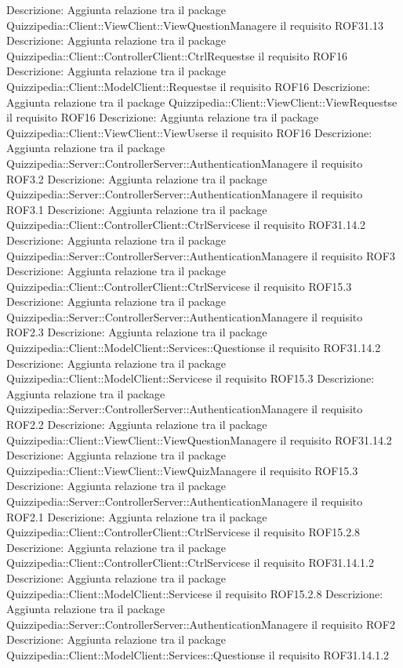 Descrizione: Aggiunta relazione tra il package Quizzipedia::Client::ViewClient::ViewQuestionManagere il requisito ROF31.13 
Descrizione: Aggiunta relazione tra il package Quizzipedia::Client::ControllerClient::CtrlRequestse il requisito ROF16 
Descrizione: Aggiunta relazione tra il package Quizzipedia::Client::ModelClient::Requestse il requisito ROF16 
Descrizione: Aggiunta relazione tra il package Quizzipedia::Client::ViewClient::ViewRequestse il requisito ROF16 
Descrizione: Aggiunta relazione tra il package Quizzipedia::Client::ViewClient::ViewUserse il requisito ROF16 
Descrizione: Aggiunta relazione tra il package Quizzipedia::Server::ControllerServer::AuthenticationManagere il requisito ROF3.2 
Descrizione: Aggiunta relazione tra il package Quizzipedia::Server::ControllerServer::AuthenticationManagere il requisito ROF3.1 
Descrizione: Aggiunta relazione tra il package Quizzipedia::Client::ControllerClient::CtrlServicese il requisito ROF31.14.2 
Descrizione: Aggiunta relazione tra il package Quizzipedia::Server::ControllerServer::AuthenticationManagere il requisito ROF3 
Descrizione: Aggiunta relazione tra il package Quizzipedia::Client::ControllerClient::CtrlServicese il requisito ROF15.3 
Descrizione: Aggiunta relazione tra il package Quizzipedia::Server::ControllerServer::AuthenticationManagere il requisito ROF2.3 
Descrizione: Aggiunta relazione tra il package Quizzipedia::Client::ModelClient::Services::Questionse il requisito ROF31.14.2 
Descrizione: Aggiunta relazione tra il package Quizzipedia::Client::ModelClient::Servicese il requisito ROF15.3 
Descrizione: Aggiunta relazione tra il package Quizzipedia::Server::ControllerServer::AuthenticationManagere il requisito ROF2.2 
Descrizione: Aggiunta relazione tra il package Quizzipedia::Client::ViewClient::ViewQuestionManagere il requisito ROF31.14.2 
Descrizione: Aggiunta relazione tra il package Quizzipedia::Client::ViewClient::ViewQuizManagere il requisito ROF15.3 
Descrizione: Aggiunta relazione tra il package Quizzipedia::Server::ControllerServer::AuthenticationManagere il requisito ROF2.1 
Descrizione: Aggiunta relazione tra il package Quizzipedia::Client::ControllerClient::CtrlServicese il requisito ROF15.2.8 
Descrizione: Aggiunta relazione tra il package Quizzipedia::Client::ControllerClient::CtrlServicese il requisito ROF31.14.1.2 
Descrizione: Aggiunta relazione tra il package Quizzipedia::Client::ModelClient::Servicese il requisito ROF15.2.8 
Descrizione: Aggiunta relazione tra il package Quizzipedia::Server::ControllerServer::AuthenticationManagere il requisito ROF2 
Descrizione: Aggiunta relazione tra il package Quizzipedia::Client::ModelClient::Services::Questionse il requisito ROF31.14.1.2 
